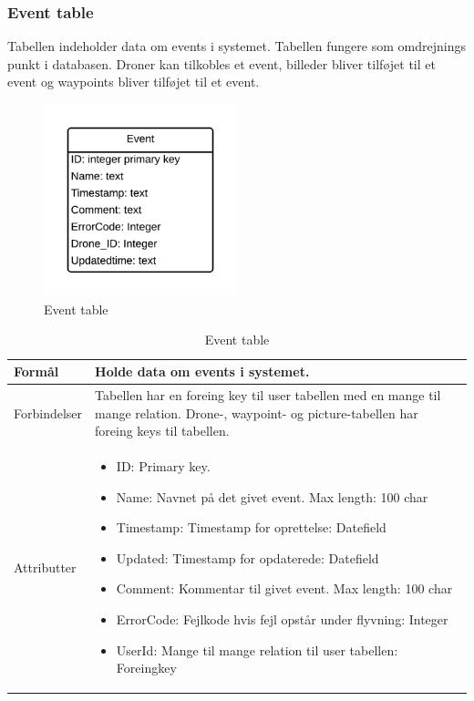 \subsubsection{Event table}
Tabellen indeholder data om events i systemet. Tabellen fungere som omdrejnings punkt i databasen. Droner kan tilkobles et event, billeder bliver tilføjet til et event og waypoints bliver tilføjet til et event.
\vspace{-5pt}
\begin{figure}[H]
	\centering
	\includegraphics[width=0.5\textwidth]{Billeder/database/EventTable.png}
	\vspace{-5pt}
	\caption{Event table}
	\label{fig:event_table}
\end{figure}

\begin{table}[H]
\begin{tabular}{| p{3cm}| p{11.5cm}|}
\hline

Formål	 							& Holde data om events i systemet.\\\hline
Forbindelser						& Tabellen har en foreing key til user tabellen med en mange til mange relation. Drone-, waypoint- og picture-tabellen har foreing keys til tabellen.\\\hline
Attributter						& \begin{itemize}
												\item ID: Primary key.
												\item Name: Navnet på det givet event. Max length: 100 char
												\item Timestamp: Timestamp for oprettelse: Datefield
												\item Updated: Timestamp for opdaterede: Datefield
												\item Comment: Kommentar til givet event. Max length: 100 char
												\item ErrorCode: Fejlkode hvis fejl opstår under flyvning: Integer
												\item UserId: Mange til mange relation til user tabellen: Foreingkey
											\end{itemize} \\\hline 
\end{tabular}
\caption{Event table}
\label{tab:event_table}
\end{table}